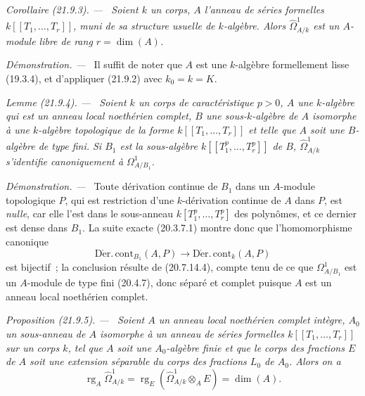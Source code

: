 \documentclass[10pt,oneside]{book}
\makeatletter
\newcommand{\setmanualcurrentlabel}[1]{\def\@currentlabel{#1}}
\newenvironment{proposition}[1][]{%
  \setmanualcurrentlabel{#1}\par\medskip\noindent\itshape Proposition (#1). ---\ }{\par}
\newenvironment{corollary}[1][]{%
  \setmanualcurrentlabel{#1}\par\medskip\noindent\itshape Corollaire (#1). ---\ }{\par}
\newenvironment{lemma}[1][]{%
  \setmanualcurrentlabel{#1}\par\medskip\noindent\itshape Lemme (#1). ---\ }{\par}
\newenvironment{proof}{%
  \par\medskip\noindent\textit{Démonstration. ---\ }}{\par}
\makeatother
\begin{document}
\begin{corollary}[21.9.3]
\label{0.21.9.3-fr}
Soient $k$ un corps, $A$ l'anneau de séries formelles
$k[[T_1,\ldots,T_r]]$, muni de sa structure usuelle de $k$-algèbre. Alors
$\widehat\Omega^1_{A/k}$ est un $A$-module libre de rang $r=\dim(A)$.
\end{corollary}

\begin{proof}
Il suffit de noter que $A$ est une $k$-algèbre formellement lisse (19.3.4),
et d'appliquer (21.9.2) avec $k_0=k=K$.
\end{proof}

\begin{lemma}[21.9.4]
\label{0.21.9.4-fr}
Soient $k$ un corps de caractéristique $p>0$, $A$ une $k$-algèbre qui est un
anneau local noethérien complet, $B$ une sous-$k$-algèbre de $A$ isomorphe à
une $k$-algèbre topologique de la forme $k[[T_1,\ldots,T_r]]$ et telle que
$A$ soit une $B$-algèbre de type fini. Si $B_1$ est la sous-algèbre
$k[[T_1^p,\ldots,T_r^p]]$ de $B$, $\widehat\Omega^1_{A/k}$ s'identifie
canoniquement à $\Omega^1_{A/B_1}$.
\end{lemma}

\begin{proof}
Toute dérivation continue de $B_1$ dans un $A$-module topologique $P$, qui
est restriction d'une $k$-dérivation continue de $A$ dans $P$, est \emph{nulle},
car elle l'est dans le sous-anneau $k[T_1^p,\ldots,T_r^p]$ des polynômes, et
ce dernier est dense dans $B_1$. La suite exacte (20.3.7.1) montre donc que
l'homomorphisme canonique
\[
  \operatorname{D\acute{e}r.\,cont}_{B_1}(A,P)
  \longrightarrow \operatorname{D\acute{e}r.\,cont}_k(A,P)
\]
est bijectif~; la conclusion résulte de (20.7.14.4), compte tenu de ce que
$\Omega^1_{A/B_1}$ est un $A$-module de type fini (20.4.7), donc séparé et
complet puisque $A$ est un anneau local noethérien complet.
\end{proof}

\begin{proposition}[21.9.5]
\label{0.21.9.5-fr}
Soient $A$ un anneau local noethérien complet intègre, $A_0$ un sous-anneau
de $A$ isomorphe à un anneau de séries formelles $k[[T_1,\ldots,T_r]]$ sur
un corps $k$, tel que $A$ soit une $A_0$-algèbre finie et que le corps des
fractions $E$ de $A$ soit une extension séparable du corps des fractions
$L_0$ de $A_0$. Alors on a
\begin{equation}
\tag{21.9.5.1}
\label{0.21.9.5.1-fr}
  \operatorname{rg}_A\widehat\Omega^1_{A/k}
  =\operatorname{rg}_E(\widehat\Omega^1_{A/k}\otimes_AE)=\dim(A).
\end{equation}
\end{proposition}
\end{document}
